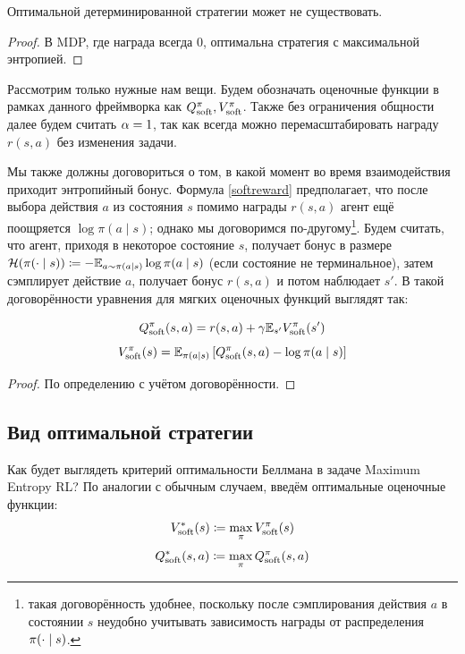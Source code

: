 \begin{proposition}
Оптимальной детерминированной стратегии может не существовать.
\begin{proof}
В MDP, где награда всегда 0, оптимальна стратегия с максимальной энтропией.
\end{proof}
\end{proposition}

Рассмотрим только нужные нам вещи. Будем обозначать оценочные функции в рамках данного фреймворка как $Q^\pi_{\mathrm{soft}}, V^\pi_{\mathrm{soft}}$. Также без ограничения общности далее будем считать $\alpha \HM= 1$, так как всегда можно перемасштабировать награду $r(s, a)$ без изменения задачи.

Мы также должны договориться о том, в какой момент во время взаимодействия приходит энтропийный бонус. Формула \eqref{softreward} предполагает, что после выбора действия $a$ из состояния $s$ помимо награды $r(s, a)$ агент ещё поощряется $\log \pi(a \mid s)$; однако мы договоримся по-другому\footnote{такая договорённость удобнее, поскольку после сэмплирования действия $a$ в состоянии $s$ неудобно учитывать зависимость награды от распределения $\pi(\cdot \HM\mid s)$.}. Будем считать, что агент, приходя в некоторое состояние $s$, получает бонус в размере $\entropy(\pi(\cdot \mid s)) \HM\coloneqq - \E_{a \sim \pi(a \mid s)} \log \pi(a \mid s)$ (если состояние не терминальное), затем сэмплирует действие $a$, получает бонус $r(s, a)$ и потом наблюдает $s'$. В такой договорённости уравнения для мягких оценочных функций выглядят так:

\begin{theorem}
$$Q^\pi_{\mathrm{soft}}(s, a) = r(s, a) + \gamma \mathbb{E}_{s'} V^\pi_{\mathrm{soft}}(s')$$
\begin{equation}\label{softVQ}
V^\pi_{\mathrm{soft}}(s) = \mathbb{E}_{\pi(a \mid s)} \left[ Q^\pi_{\mathrm{soft}}(s, a) - \log \pi(a \mid s) \right]
\end{equation}
\begin{proof}
По определению с учётом договорённости.
\end{proof}
\end{theorem}

\subsection{Вид оптимальной стратегии}

Как будет выглядеть критерий оптимальности Беллмана в задаче Maximum Entropy RL? По аналогии с обычным случаем, введём оптимальные оценочные функции:
$$V^*_{\mathrm{soft}}(s) \coloneqq \max_{\pi} V^{\pi}_{\mathrm{soft}}(s)$$
$$Q^*_{\mathrm{soft}}(s, a) \coloneqq \max_{\pi} Q^{\pi}_{\mathrm{soft}}(s, a)$$

